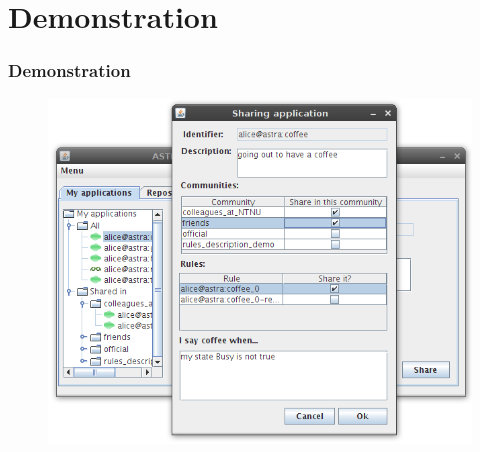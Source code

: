 \section{Demonstration}

\begin{frame}
	\frametitle{Demonstration} 

	\begin{figure}
	 	\includegraphics[scale=0.37]{img/ui-sharing.png}
	\end{figure}

\end{frame}
